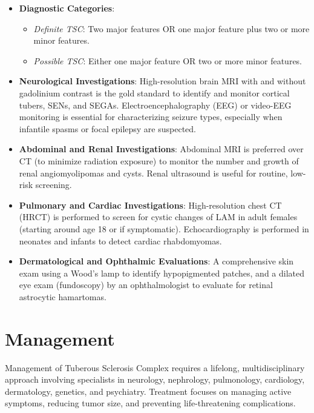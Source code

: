 \begin{itemize}
\begin{itemize}
        \item Nonrenal hamartomas.
    \end{itemize}
    \item \textbf{Diagnostic Categories}:
    \begin{itemize}
        \item \textit{Definite TSC}: Two major features OR one major feature plus two or more minor features.
        \item \textit{Possible TSC}: Either one major feature OR two or more minor features.
    \end{itemize}
    \item \textbf{Neurological Investigations}: High-resolution brain MRI with and without gadolinium contrast is the gold standard to identify and monitor cortical tubers, SENs, and SEGAs. Electroencephalography (EEG) or video-EEG monitoring is essential for characterizing seizure types, especially when infantile spasms or focal epilepsy are suspected.
    \item \textbf{Abdominal and Renal Investigations}: Abdominal MRI is preferred over CT (to minimize radiation exposure) to monitor the number and growth of renal angiomyolipomas and cysts. Renal ultrasound is useful for routine, low-risk screening.
    \item \textbf{Pulmonary and Cardiac Investigations}: High-resolution chest CT (HRCT) is performed to screen for cystic changes of LAM in adult females (starting around age 18 or if symptomatic). Echocardiography is performed in neonates and infants to detect cardiac rhabdomyomas.
    \item \textbf{Dermatological and Ophthalmic Evaluations}: A comprehensive skin exam using a Wood's lamp to identify hypopigmented patches, and a dilated eye exam (fundoscopy) by an ophthalmologist to evaluate for retinal astrocytic hamartomas.
\end{itemize}

\section*{Management}
Management of Tuberous Sclerosis Complex requires a lifelong, multidisciplinary approach involving specialists in neurology, nephrology, pulmonology, cardiology, dermatology, genetics, and psychiatry. Treatment focuses on managing active symptoms, reducing tumor size, and preventing life-threatening complications.

